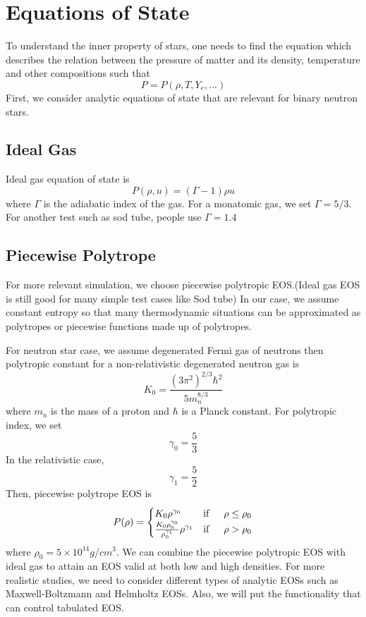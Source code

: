 \documentclass[notes.tex]{subfiles}
\begin{document}
\section{Equations of State}
\label{sec:eos}
To understand the inner property of stars, one needs to find the equation which describes the relation between the pressure of matter and its density, temperature and other compositions such that
\begin{equation}
P = P(\rho, T, Y_e, ...)
\end{equation}
First, we consider analytic equations of state that are relevant for binary neutron stars.

\subsection{Ideal Gas}
Ideal gas equation of state is
\begin{equation}
P(\rho,u) = (\Gamma - 1) \rho u
\end{equation}
where $\Gamma$ is the adiabatic index of the gas. For a monatomic gas, we set $\Gamma = 5/3$. For another test such as sod tube, people use $\Gamma = 1.4$

\subsection{Piecewise Polytrope}
For more relevant simulation, we choose piecewise polytropic EOS.(Ideal gas EOS is still good for many simple test cases like Sod tube) In our case, we assume constant entropy so that many thermodynamic situations can be approximated as polytropes or piecewise functions made up of polytropes.

For neutron star case, we assume degenerated Fermi gas of neutrons then polytropic constant for a non-relativistic degenerated neutron gas is
\begin{equation}
K_0 = \frac{(3 \pi^2)^{2/3} \hbar^2}{5 m_n^{8/3}}
\end{equation}
where $m_n$ is the mass of a proton and $\hbar$ is a Planck constant. For polytropic index, we set
\begin{equation}
\gamma_0 = \frac{5}{3}
\end{equation}
In the relativistic case,
\begin{equation}
\gamma_1 = \frac{5}{2}
\end{equation}
Then, piecewise polytrope EOS is
\begin{equation}
P(\rho) = \begin{cases}
K_0 \rho^{\gamma_0} & \text{if} \indent \rho \leq \rho_0 \\
\frac{K_0 \rho_0^{\gamma_0}}{\rho_0^{\gamma_1}} \rho^{\gamma_1} & \text{if} \indent \rho > \rho_0
\end{cases}
\end{equation}
where $\rho_0 = 5 \times 10^{14} g/cm^3$. We can combine the piecewise polytropic EOS with ideal gas to attain an EOS valid at both low and high densities. For more realistic studies, we need to consider different types of analytic EOSs such as Maxwell-Boltzmann and Helmholtz EOSs. Also, we will put the functionality that can control tabulated EOS.
\end{document}
